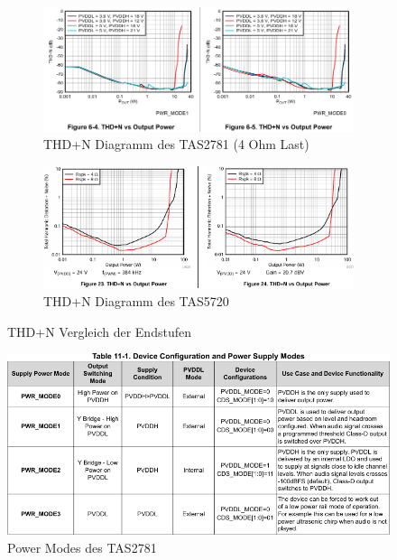 \begin{figure}[H]
	\centering
	\begin{subfigure}{\textwidth}
		\centering
		\includegraphics[width=\textwidth*7/8]{pictures/TAS2781_THDN_maxV.png}
		\vspace{2mm}
		\caption{THD+N Diagramm des TAS2781 (4 Ohm Last)}
		\label{pic:thdn_perf_TAS2781}
		\vspace{8mm}
	\end{subfigure}
	\begin{subfigure}{\textwidth}
		\centering
		\includegraphics[width=\textwidth*7/8]{pictures/tas5720l_THDN_Vmax.png}
		\vspace{2mm}
		\caption{THD+N Diagramm des TAS5720}
		\label{pic:thdn_perf_TAS5720}
	\end{subfigure}
	\caption{THD+N Vergleich der Endstufen}
	\label{pic:thdn_vergleich}
\end{figure}
\begin{figure}[h]
	\centering
	\includegraphics[width=\textwidth*7/8]{pictures/TAS2781_powermodes.png}
	\caption{Power Modes des TAS2781}
	\label{pic:TAS2781_powermodes}
\end{figure}
